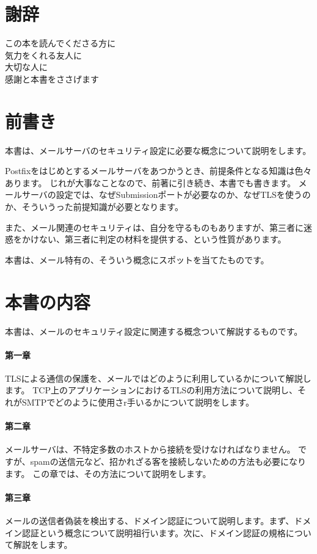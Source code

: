 \section*{謝辞}
\begin{center}
この本を読んでくださる方に \\
気力をくれる友人に \\
大切な人に \\
感謝と本書をささげます
\end{center}

\section*{前書き}

本書は、メールサーバのセキュリティ設定に必要な概念について説明をします。

Postfixをはじめとするメールサーバをあつかうとき、前提条件となる知識は色々あります。
じれが大事なことなので、前著に引き続き、本書でも書きます。
メールサーバの設定では、なぜSubmissionポートが必要なのか、なぜTLSを使うのか、そういうった前提知識が必要となります。

また、メール関連のセキュリティは、自分を守るものもありますが、第三者に迷惑をかけない、第三者に判定の材料を提供する、という性質があります。

本書は、メール特有の、そういう概念にスポットを当てたものです。


\section*{本書の内容}
本書は、メールのセキュリティ設定に関連する概念ついて解説するものです。

\paragraph{第一章}
TLSによる通信の保護を、メールではどのように利用しているかについて解説します。
TCP上のアプリケーションにおけるTLSの利用方法について説明し、それがSMTPでどのように使用さr手いるかについて説明をします。

\paragraph{第二章}
メールサーバは、不特定多数のホストから接続を受けなければなりません。
ですが、spamの送信元など、招かれざる客を接続しないための方法も必要になります。
この章では、その方法について説明をします。


\paragraph{第三章}
メールの送信者偽装を検出する、ドメイン認証について説明します。まず、ドメイン認証という概念について説明祖行います。次に、ドメイン認証の規格について解説をします。


